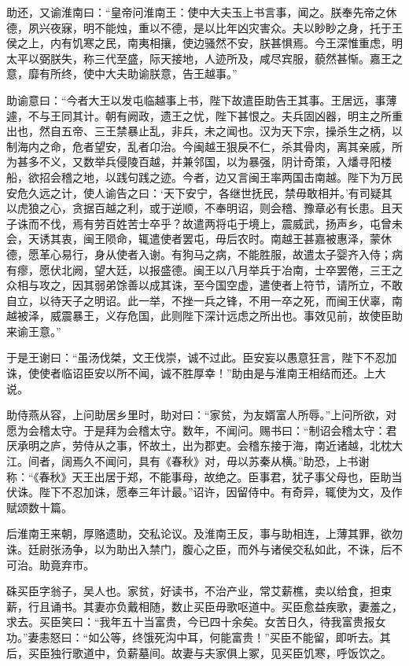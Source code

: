 \documentclass[12pt,UTF8]{ctexbook}
\begin{document}
助还，又谕淮南曰：“皇帝问淮南王：使中大夫玉上书言事，闻之。朕奉先帝之休德，夙兴夜寐，明不能烛，重以不德，是以比年凶灾害众。夫以眇眇之身，托于王侯之上，内有饥寒之民，南夷相攘，使边骚然不安，朕甚惧焉。今王深惟重虑，明太平以弼朕失，称三代至盛，际天接地，人迹所及，咸尽宾服，藐然甚惭。嘉王之意，靡有所终，使中大夫助谕朕意，告王越事。”



助谕意曰：“今者大王以发屯临越事上书，陛下故遣臣助告王其事。王居远，事薄遽，不与王同其计。朝有阙政，遗王之忧，陛下甚恨之。夫兵固凶器，明主之所重出也，然自五帝、三王禁暴止乱，非兵，未之闻也。汉为天下宗，操杀生之柄，以制海内之命，危者望安，乱者卬治。今闽越王狠戾不仁，杀其骨肉，离其亲戚，所为甚多不义，又数举兵侵陵百越，并兼邻国，以为暴强，阴计奇策，入燔寻阳楼船，欲招会稽之地，以践句践之迹。今者，边又言闽王率两国击南越。陛下为万民安危久远之计，使人谕告之曰：‘天下安宁，各继世抚民，禁毋敢相并。’有司疑其以虎狼之心，贪据百越之利，或于逆顺，不奉明诏，则会稽、豫章必有长患。且天子诛而不伐，焉有劳百姓苦士卒乎？故遣两将屯于境上，震威武，扬声乡，屯曾未会，天诱其衷，闽王陨命，辄遣使者罢屯，毋后农时。南越王甚嘉被惠泽，蒙休德，愿革心易行，身从使者入谢。有狗马之病，不能胜服，故遣太子婴齐入侍；病有瘳，愿伏北阙，望大廷，以报盛德。闽王以八月举兵于冶南，士卒罢倦，三王之众相与攻之，因其弱弟馀善以成其诛，至今国空虚，遣使者上符节，请所立，不敢自立，以待天子之明诏。此一举，不挫一兵之锋，不用一卒之死，而闽王伏辜，南越被泽，威震暴王，义存危国，此则陛下深计远虑之所出也。事效见前，故使臣助来谕王意。”



于是王谢曰：“虽汤伐桀，文王伐崇，诚不过此。臣安妄以愚意狂言，陛下不忍加诛，使使者临诏臣安以所不闻，诚不胜厚幸！”助由是与淮南王相结而还。上大说。



助侍燕从容，上问助居乡里时，助对曰：“家贫，为友婿富人所辱。”上问所欲，对愿为会稽太守。于是拜为会稽太守。数年，不闻问。赐书曰：“制诏会稽太守：君厌承明之庐，劳侍从之事，怀故土，出为郡吏。会稽东接于海，南近诸越，北枕大江。间者，阔焉久不闻问，具有《春秋》对，毋以苏秦从横。”助恐，上书谢称：“《春秋》天王出居于郑，不能事母，故绝之。臣事君，犹子事父母也，臣助当伏诛。陛下不忍加诛，愿奉三年计最。”诏许，因留侍中。有奇异，辄使为文，及作赋颂数十篇。



后淮南王来朝，厚赂遗助，交私论议。及淮南王反，事与助相连，上薄其罪，欲勿诛。廷尉张汤争，以为助出入禁门，腹心之臣，而外与诸侯交私如此，不诛，后不可治。助竟弃市。



硃买臣字翁子，吴人也。家贫，好读书，不治产业，常艾薪樵，卖以给食，担束薪，行且诵书。其妻亦负戴相随，数止买臣毋歌呕道中。买臣愈益疾歌，妻羞之，求去。买臣笑曰：“我年五十当富贵，今已四十余矣。女苦日久，待我富贵报女功。”妻恚怒曰：“如公等，终饿死沟中耳，何能富贵！”买臣不能留，即听去。其后，买臣独行歌道中，负薪墓间。故妻与夫家俱上冢，见买臣饥寒，呼饭饮之。
\end{document}
